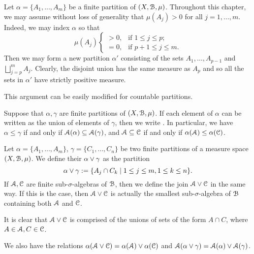 \begin{remark}
	Let $\alpha = \{A_1, \dots, A_m\}$ be a finite partition of $(X, \mathcal{B}, \mu)$. Throughout this chapter, we may assume without loss of generality that $\mu(A_j) > 0$ for all $j = 1, \dots, m$. Indeed, we may index $\alpha$ so that
	\[
		\mu(A_j)
		\begin{cases}
			> 0, & \text{if } 1 \leq j \leq p; \\
			= 0, & \text{if } p + 1 \leq j \leq m.
		\end{cases}
	\]
	Then we may form a new partition $\alpha'$ consisting of the sets $A_1, \dots, A_{p - 1}$ and $\bigsqcup_{j = p}^m{A_j}$. Clearly, the disjoint union has the same measure as $A_p$ and so all the sets in $\alpha'$ have strictly positive measure.
	
	This argument can be easily modified for countable partitions.
\end{remark}

\begin{definition}
	Suppose that $\alpha, \gamma$ are finite partitions of $(X, \mathcal{B}, \mu)$. If each element of $\alpha$ can be written as the union of elements of $\gamma$, then we write \key{$\alpha \leq \gamma$}. In particular, we have $\alpha \leq \gamma$ if and only if $\mathcal{A}(\alpha) \subseteq \mathcal{A}(\gamma)$, and $\mathcal{A} \subseteq \mathcal{C}$ if and only if $\alpha(\mathcal{A}) \leq \alpha(\mathcal{C})$.
\end{definition}

\begin{definition}
	Let $\alpha = \{A_1, \dots, A_m\}$, $\gamma = \{C_1, \dots, C_n\}$ be two finite partitions of a measure space $(X, \mathcal{B}, \mu)$. We define their  $\alpha \vee \gamma$ as the partition
	\[
		\alpha \vee \gamma := \{A_j \cap C_k \mid 1 \leq j \leq m, 1 \leq k \leq n\}.
	\]
	If $\mathcal{A}, \mathcal{C}$ are finite sub-$\sigma$-algebras of $\mathcal{B}$, then we define the join $\mathcal{A} \vee \mathcal{C}$ in the same way. If this is the case, then $\mathcal{A} \vee \mathcal{C}$ is actually the smallest sub-$\sigma$-algebra of $\mathcal{B}$ containing both $\mathcal{A}$ and $\mathcal{C}$.
	
	It is clear that $\mathcal{A} \vee \mathcal{C}$ is comprised of the unions of sets of the form $A \cap C$, where $A \in \mathcal{A}, C \in \mathcal{C}$.
	
	We also have the relations $\alpha(\mathcal{A} \vee \mathcal{C}) = \alpha(\mathcal{A}) \vee \alpha(\mathcal{C})$ and $\mathcal{A}(\alpha \vee \gamma) = \mathcal{A}(\alpha) \vee \mathcal{A}(\gamma)$.
\end{definition}

